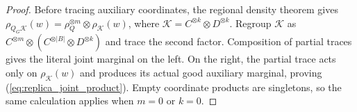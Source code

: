 \begin{proof}
\leanok
{}
Before tracing auxiliary coordinates, the regional density theorem gives
$\rho_{Q_G\mathcal K}(w)=\rho_Q^{\otimes m}\otimes\rho_{\mathcal K}(w)$,
where $\mathcal K=C^{\otimes k}\otimes D^{\otimes k}$.
Regroup $\mathcal K$ as $C^{\otimes m}\otimes
(C^{\otimes|B|}\otimes D^{\otimes k})$ and trace the second factor.
Composition of partial traces gives the literal joint marginal on the left.
On the right, the partial trace acts only on $\rho_{\mathcal K}(w)$ and
produces its actual good auxiliary marginal, proving
(\ref{eq:replica_joint_product}). Empty coordinate products are singletons,
so the same calculation applies when $m=0$ or $k=0$.
\end{proof}
